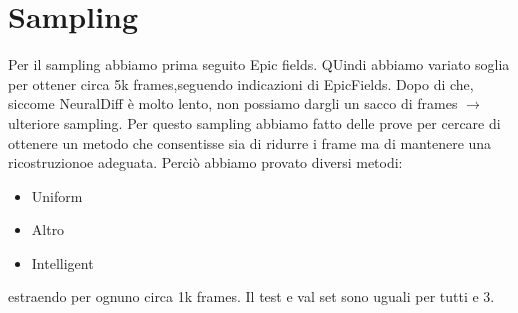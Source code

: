 \section{Sampling}
Per il sampling abbiamo prima seguito Epic fields. QUindi abbiamo variato soglia per ottener
circa 5k frames,seguendo indicazioni di EpicFields. Dopo di che, siccome NeuralDiff è 
molto lento, non possiamo dargli un sacco di frames $\rightarrow$ ulteriore sampling. 
Per questo sampling abbiamo fatto delle prove per cercare di ottenere un metodo
che consentisse sia di ridurre i frame ma di mantenere una ricostruzionoe adeguata.
Perciò abbiamo provato diversi metodi:
\begin{itemize}
    \item Uniform
    \item Altro
    \item Intelligent
\end{itemize}
estraendo per ognuno circa 1k frames.
Il test e val set sono uguali per tutti e 3.